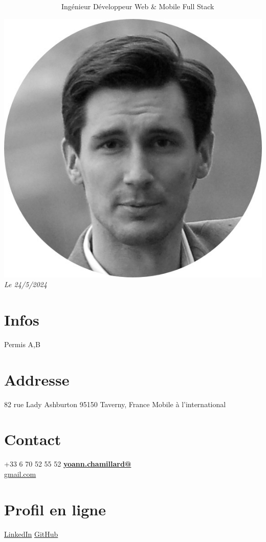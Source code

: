 \documentclass[]{friggeri-cv}
\begin{document}
      {~~~~~~~~~~~~~~~~Ingénieur Développeur Web \& Mobile Full Stack}
      {}

\begin{aside}
\includegraphics[scale=0.28]{res/img/Photo_CV.jpg}
	\emph{Le 24/5/2024} \hspace*{8mm}
\section{Infos}
Permis A,B
\section{Addresse}
82 rue Lady Ashburton
95150 Taverny,
France
Mobile à l'international
\section{Contact}
+33 6 70 52 55 52
\href{mailto:yoann.chamillard@gmail.com}{\textbf{yoann.chamillard@}\\gmail.com}
\section{Profil en ligne}
\href{http://fr.linkedin.com/in/yoannchamillard}{LinkedIn}
\href{https://github.com/Nokheenig?tab=stars}{GitHub}

\end{aside}
\end{document}
